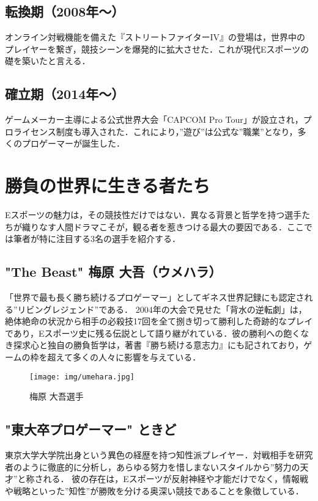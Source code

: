 \documentclass[twocolumn, a4paper]{Zemiresume}
\begin{document}
\subsection{転換期（2008年〜）}
オンライン対戦機能を備えた『ストリートファイターIV』の登場は，世界中のプレイヤーを繋ぎ，競技シーンを爆発的に拡大させた．これが現代Eスポーツの礎を築いたと言える．

\subsection{確立期（2014年〜）}
ゲームメーカー主導による公式世界大会「CAPCOM Pro Tour」が設立され，プロライセンス制度も導入された．これにより，”遊び”は公式な”職業”となり，多くのプロゲーマーが誕生した．

\section{勝負の世界に生きる者たち}
Eスポーツの魅力は，その競技性だけではない．異なる背景と哲学を持つ選手たちが織りなす人間ドラマこそが，観る者を惹きつける最大の要因である．ここでは筆者が特に注目する3名の選手を紹介する．

\subsection{"The Beast" 梅原 大吾（ウメハラ）}
「世界で最も長く勝ち続けるプロゲーマー」としてギネス世界記録にも認定される”リビングレジェンド”である\cite{cite:guinness_umehara}．
2004年の大会で見せた「背水の逆転劇」は，絶体絶命の状況から相手の必殺技17回を全て捌き切って勝利した奇跡的なプレイであり，Eスポーツ史に残る伝説として語り継がれている．彼の勝利への飽くなき探求心と独自の勝負哲学は，著書『勝ち続ける意志力』\cite{cite:umehara_book}にも記されており，ゲームの枠を超えて多くの人々に影響を与えている．

\begin{figure}[b]
  \centering
  \texttt{[image: img/umehara.jpg]}
  \caption{梅原 大吾選手}\label{fig:umehara}
\end{figure}

\subsection{"東大卒プロゲーマー" ときど}
東京大学大学院出身という異色の経歴を持つ知性派プレイヤー．対戦相手を研究者のように徹底的に分析し，あらゆる努力を惜しまないスタイルから”努力の天才”と称される．
彼の存在は，Eスポーツが反射神経や才能だけでなく，情報戦や戦略といった”知性”が勝敗を分ける奥深い競技であることを象徴している．
\end{document}
